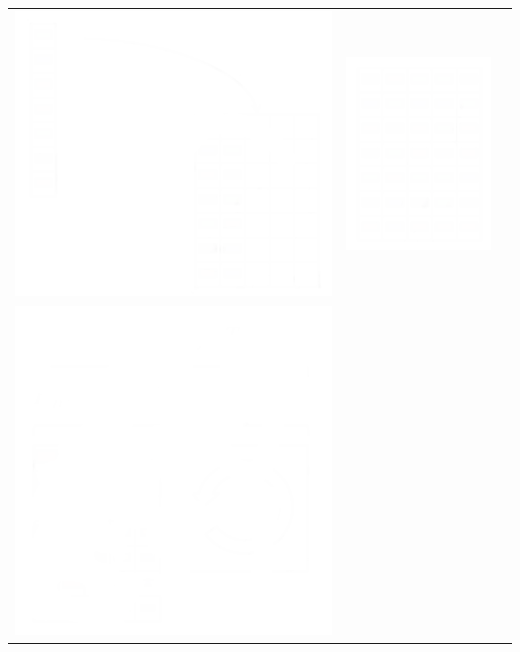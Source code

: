 \documentclass{beamer}
\begin{document}
\begin{frame}
\begin{center}
\begin{tabular}{ccc}
			   \includegraphics*[scale=0.23]{figures/FD2_white.png} 
			&  \includegraphics*[scale=0.23]{figures/FD3_white.png}  \\
			\includegraphics*[scale=0.23]{figures/FD4_white.png}  

\end{tabular}
\end{center}
\end{frame}
\end{document}

